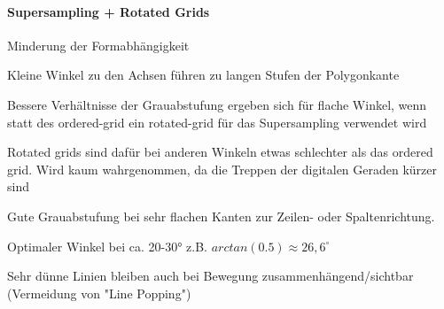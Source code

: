 \documentclass[landscape]{article}
\begin{document}
\begin{multicols}{3}
  \paragraph{Supersampling + Rotated Grids}
  \begin{itemize*}
    \item Minderung der Formabhängigkeit
    \item Kleine Winkel zu den Achsen führen zu langen Stufen der Polygonkante
    \item Bessere Verhältnisse der Grauabstufung ergeben sich für flache Winkel, wenn statt des ordered-grid ein rotated-grid für das Supersampling verwendet wird
    \item Rotated grids sind dafür bei anderen Winkeln etwas schlechter als das ordered grid. Wird kaum wahrgenommen, da die Treppen der digitalen Geraden kürzer sind
    \item Gute Grauabstufung bei sehr flachen Kanten zur Zeilen- oder Spaltenrichtung.
    \item Optimaler Winkel bei ca. 20-30° z.B. $arctan(0.5) \approx 26,6^{\circ}$
    \item Sehr dünne Linien bleiben auch bei Bewegung zusammenhängend/sichtbar (Vermeidung von "Line Popping")
  \end{itemize*}


\end{multicols}
\end{document}
